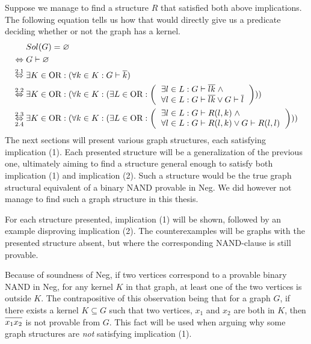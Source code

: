 Suppose we manage to find a structure $R$ that satisfied both above implications.
The following equation tells us how that would directly give us a predicate deciding whether or not the graph has a kernel.
\begin{align}
  &Sol(G) = \varnothing\\
  \Leftrightarrow\; &G \vdash \varnothing\\
  \overset{2.1}{\Leftrightarrow}\;&\exists K \in \text{OR}: (\forall  k \in K: G \vdash \ol{k})\\
  \overset{2.2}{\Leftrightarrow}\;&\exists K \in \text{OR}: (\forall  k \in K: ( \exists L \in \text{OR}:
  \left ( \begin{tabular}{l}
  $\exists l \in L: G \vdash \ol{lk} \; \wedge$\\
  $\forall l \in L: G \vdash \ol{lk} \vee G \vdash \ol{l}$
  \end{tabular} \right ) ) )\\
  \overset{2.3}{\underset{2.4}{\Leftrightarrow}}\;&\exists K \in \text{OR}: (\forall  k \in K: ( \exists L \in \text{OR}:
  \left ( \begin{tabular}{l}
  $\exists l \in L: G \vdash R(l,k) \; \wedge$\\
  $\forall l \in L: G \vdash R(l,k) \vee G \vdash R(l,l)$
  \end{tabular} \right ) ) )
\end{align}
The next sections will present various graph structures, each satisfying implication (1).
Each presented structure will be a generalization of the previous one, ultimately aiming to find a structure general enough to satisfy both implication (1) and implication (2).
Such a structure would be the true graph structural equivalent of a binary NAND provable in Neg.
We did however not manage to find such a graph structure in this thesis.

For each structure presented, implication (1) will be shown, followed by an example disproving implication (2).
The counterexamples will be graphs with the presented structure absent, but where the corresponding NAND-clause is still provable.

Because of soundness of Neg, if two vertices correspond to a provable binary NAND in Neg, for any kernel $K$ in that graph, at least one of the two vertices is outside $K$.
The contrapositive of this observation being that for a graph $G$, if there exists a kernel $K \subseteq G$ such that two vertices, $x_1$ and $x_2$ are both in $K$, then $\ol{x_1x_2}$ is not provable from $G$.
This fact will be used when arguing why some graph structures are \textit{not} satisfying implication (1).
